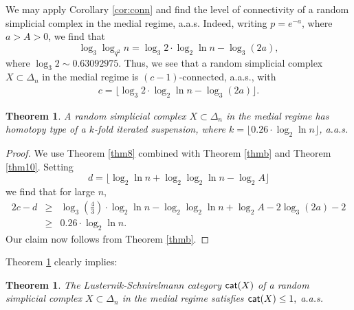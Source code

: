 \documentclass[11pt,twoside, reqno]{amsart}
\theoremstyle{plain}
\newtheorem{teo}[lema]{Theorem}
\theoremstyle{definition}
\newcommand{\cat}{{\sf{cat}}}
\begin{document}
We may apply Corollary \ref{cor:conn} 
and find the level of connectivity of a random simplicial complex in the medial regime, a.a.s. 
Indeed, writing $p=e^{-a}$, where $a>A>0$, we find that 
$$
\log_3\log_{q^2}n= \log_3 2\cdot \log_2\ln n - \log_3(2a), 
$$
where $\log_3 2\sim 0.63092975$. Thus, we see that a random simplicial complex $X\subset \Delta_n$ in the medial regime is $(c-1)$-connected, a.a.s.,
with 
\begin{eqnarray*}\label{c}
c=\lfloor  
  \log_3 2\cdot \log_2\ln n - \log_3(2a)  
\rfloor.
\end{eqnarray*}
\begin{teo}\label{thm14}
A random simplicial complex $X\subset \Delta_n$ in the medial regime has homotopy type of a $k$-fold iterated suspension, where $k=\lfloor 0.26 \cdot \log_2\ln n\rfloor$, a.a.s.
\end{teo}
\begin{proof} We use Theorem \ref{thm8} combined with Theorem \ref{thmb} and Theorem \ref{thm10}. 
Setting $$d=\lfloor \log_2\ln n +\log_2\log_2\ln n- \log_2 A\rfloor$$
we find that for large $n$, 
\begin{eqnarray*}
2c-d &\ge & \log_3\left(\frac{4}{3}\right) \cdot \log_2\ln n -\log_2\log_2\ln n +\log_2 A -2\log_3(2a)-2\\
&\ge& 0.26 \cdot \log_2\ln n.
\end{eqnarray*}
Our claim now follows from Theorem \ref{thmb}. 
\end{proof}
Theorem \ref{thm14} clearly implies:

\begin{teo}\label{thm:thm1}
The Lusternik-Schnirelmann category $\cat(X)$ of a random simplicial complex $X\subset \Delta_n$ in the medial regime satisfies
$
\cat(X)\le 1,
$
a.a.s. %
\end{teo}

%
%
%
%
%
%
\end{document}
